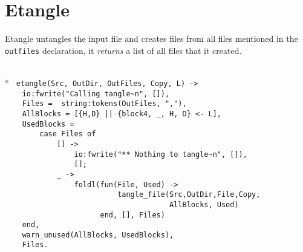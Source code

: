 \section*{Etangle}

Etangle untangles the input 
file and creates files from all files mentioned in the
\verb+outfiles+ declaration, it {\sl returns\/} a list of all files
that it created.

\begin{flushleft}
\label{etangle_start}
\\*
\tt
\noindent{}%
\verb&etangle(Src, OutDir, OutFiles, Copy, L) ->&\\
\noindent{}%
\verb&    io:fwrite("Calling tangle~n", []),&\\
\noindent{}%
\verb&    Files =  string:tokens(OutFiles, ","),&\\
\noindent{}%
\verb&    AllBlocks = [{H,D} || {block4, _, H, D} <- L],&\\
\noindent{}%
\verb&    UsedBlocks = &\\
\noindent{}%
\verb&        case Files of&\\
\noindent{}%
\verb&            [] ->&\\
\noindent{}%
\verb&                io:fwrite("** Nothing to tangle~n", []),&\\
\noindent{}%
\verb&                [];&\\
\noindent{}%
\verb&            _ ->&\\
\noindent{}%
\verb&                foldl(fun(File, Used) ->&\\
\noindent{}%
\verb&                          tangle_file(Src,OutDir,File,Copy, &\\
\noindent{}%
\verb&                                      AllBlocks, Used)&\\
\noindent{}%
\verb&                      end, [], Files)&\\
\noindent{}%
\verb&    end,&\\
\noindent{}%
\verb&    warn_unused(AllBlocks, UsedBlocks),&\\
\noindent{}%
\verb&    Files.&\\
\end{flushleft}

